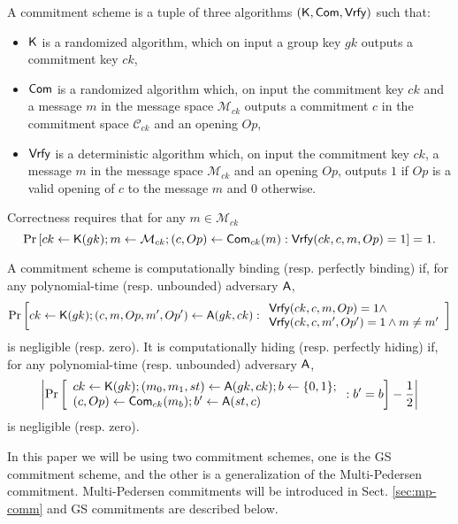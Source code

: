 
\begin{definition} A commitment scheme is a tuple of three algorithms 
	$(\mathsf{K},\mathsf{Com},\mathsf{Vrfy})$ such that:
	\begin{itemize} 
		\item  $\mathsf{K}$ is a randomized algorithm, which on input a group key $gk$ outputs a commitment key $ck$,
		\item $\mathsf{Com}$ is a randomized algorithm which, on input the commitment key $ck$ and a message 
		$m$ in the message space $\mathcal{M}_{ck}$ outputs a commitment $c$ in the commitment space $\mathcal{C}_{ck}$ and an opening $Op$, 
	\item $\mathsf{Vrfy}$ is a deterministic algorithm which, on input the commitment key $ck$,  a message 
	$m$ in the message space $\mathcal{M}_{ck}$ and an opening $Op$, outputs $1$ if $Op$ is a valid opening of $c$ to the message $m$ and $0$ otherwise. 
	\end{itemize}
\end{definition}

Correctness requires that for any $m \in \mathcal{M}_{ck}$
$$\Pr\left[ck \gets \mathsf{K}(gk); m \gets \mathcal{M}_{ck}; 
(c, Op) \gets \mathsf{Com}_{ck}(m): \mathsf{Vrfy}(ck,c,m,Op)=1 \right]=1.$$


\begin{definition}  A commitment scheme is computationally binding (resp. perfectly binding) if, for any polynomial-time (resp. unbounded)  adversary $\mathsf{A}$, 
	$$\Pr\left[ck \gets \mathsf{K}(gk); (c,m,Op,m',Op') \gets \mathsf{A}(gk,ck): \begin{array}{l}\mathsf{Vrfy}(ck,c,m,Op)=1 \wedge\\ \mathsf{Vrfy}(ck,c,m',Op')=1 \wedge m\neq m'\end{array}\right] $$
	is negligible (resp. zero).  It is computationally hiding (resp. perfectly hiding)  if, for any polynomial-time (resp. unbounded) adversary $\mathsf{A}$,
	$$\left|\Pr\left[ \begin{array}{l} ck \gets \mathsf{K}(gk); (m_0,m_1,st) \gets \mathsf{A}(gk,ck); b \gets \{0,1\};\\ (c,Op) \gets \mathsf{Com}_{ck}(m_b); b' \gets \mathsf{A}(st,c)
                      \end{array} : b'=b\right] -\dfrac{1}{2} \right|$$
	is negligible (resp. zero).
\end{definition}

In this paper we will be using two commitment schemes, one is the GS commitment scheme, and the other is a generalization of the Multi-Pedersen commitment. Multi-Pedersen commitments will be introduced in Sect. \ref{sec:mp-comm} and GS commitments are described below.

